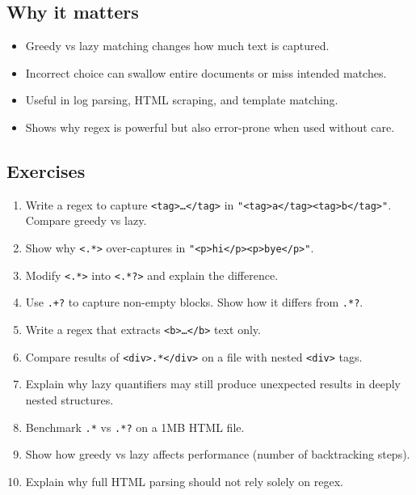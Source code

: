 \documentclass[
  letterpaper,
  DIV=11,
  numbers=noendperiod]{scrreprt}
\providecommand{\tightlist}{%
  \setlength{\itemsep}{0pt}\setlength{\parskip}{0pt}}
\begin{document}
\subsection{Why it matters}\label{why-it-matters-56}

\begin{itemize}
\tightlist
\item
  Greedy vs lazy matching changes how much text is captured.
\item
  Incorrect choice can swallow entire documents or miss intended
  matches.
\item
  Useful in log parsing, HTML scraping, and template matching.
\item
  Shows why regex is powerful but also error-prone when used without
  care.
\end{itemize}

\subsection{Exercises}\label{exercises-55}

\begin{enumerate}
\def\labelenumi{\arabic{enumi}.}
\tightlist
\item
  Write a regex to capture
  \texttt{\textless{}tag\textgreater{}…\textless{}/tag\textgreater{}} in
  \texttt{"\textless{}tag\textgreater{}a\textless{}/tag\textgreater{}\textless{}tag\textgreater{}b\textless{}/tag\textgreater{}"}.
  Compare greedy vs lazy.
\item
  Show why \texttt{\textless{}.*\textgreater{}} over-captures in
  \texttt{"\textless{}p\textgreater{}hi\textless{}/p\textgreater{}\textless{}p\textgreater{}bye\textless{}/p\textgreater{}"}.
\item
  Modify \texttt{\textless{}.*\textgreater{}} into
  \texttt{\textless{}.*?\textgreater{}} and explain the difference.
\item
  Use \texttt{.+?} to capture non-empty blocks. Show how it differs from
  \texttt{.*?}.
\item
  Write a regex that extracts
  \texttt{\textless{}b\textgreater{}…\textless{}/b\textgreater{}} text
  only.
\item
  Compare results of
  \texttt{\textless{}div\textgreater{}.*\textless{}/div\textgreater{}}
  on a file with nested \texttt{\textless{}div\textgreater{}} tags.
\item
  Explain why lazy quantifiers may still produce unexpected results in
  deeply nested structures.
\item
  Benchmark \texttt{.*} vs \texttt{.*?} on a 1MB HTML file.
\item
  Show how greedy vs lazy affects performance (number of backtracking
  steps).
\item
  Explain why full HTML parsing should not rely solely on regex.
\end{enumerate}
\end{document}
